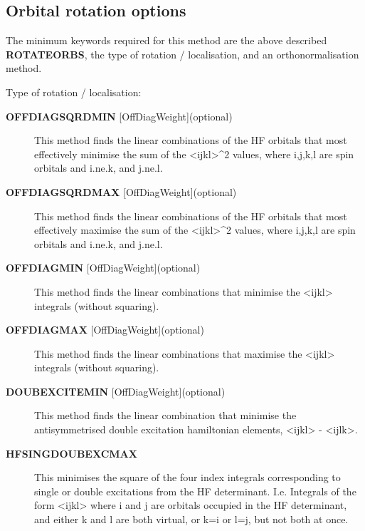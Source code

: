 \documentclass[openany,a4paper,10pt,english]{manual}
\begin{document}
\subsection{Orbital rotation options}

The minimum keywords required for this method are the above described \textbf{ROTATEORBS},
the type of rotation / localisation, and an orthonormalisation method.

Type of rotation / localisation:
\begin{description}
\item[\textbf{OFFDIAGSQRDMIN} {[}OffDiagWeight{]}(optional)] \leavevmode
This method finds the linear combinations of the HF orbitals that most effectively
minimise the sum of the \textless{}ij\textbar{}kl\textgreater{}\textasciicircum{}2 values, where i,j,k,l are spin orbitals and
i.ne.k, and j.ne.l.

\item[\textbf{OFFDIAGSQRDMAX} {[}OffDiagWeight{]}(optional)] \leavevmode
This method finds the linear combinations of the HF orbitals that most effectively
maximise the sum of the \textless{}ij\textbar{}kl\textgreater{}\textasciicircum{}2 values, where i,j,k,l are spin orbitals and
i.ne.k, and j.ne.l.

\item[\textbf{OFFDIAGMIN} {[}OffDiagWeight{]}(optional)] \leavevmode
This method finds the linear combinations that minimise the \textless{}ij\textbar{}kl\textgreater{} integrals (without
squaring).

\item[\textbf{OFFDIAGMAX} {[}OffDiagWeight{]}(optional)] \leavevmode
This method finds the linear combinations that maximise the \textless{}ij\textbar{}kl\textgreater{} integrals (without
squaring).

\item[\textbf{DOUBEXCITEMIN} {[}OffDiagWeight{]}(optional)] \leavevmode
This method finds the linear combination that minimise the antisymmetrised double excitation
hamiltonian elements, \textless{}ij\textbar{}kl\textgreater{} - \textless{}ij\textbar{}lk\textgreater{}.

\item[\textbf{HFSINGDOUBEXCMAX}] \leavevmode
This minimises the square of the four index integrals corresponding to single or double
excitations from the HF determinant.  I.e. Integrals of the form \textless{}ij\textbar{}kl\textgreater{} where i and j
are orbitals occupied in the HF determinant, and either k and l are both virtual, or k=i
or l=j, but not both at once.


\end{description}
\end{document}

